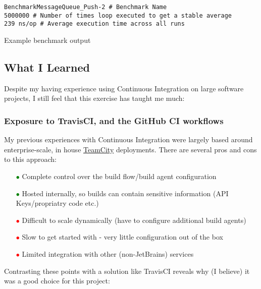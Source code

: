\begin{listing}
  \centering
  \begin{verbatim}
BenchmarkMessageQueue_Push-2 # Benchmark Name
5000000 # Number of times loop executed to get a stable average
239 ns/op # Average execution time across all runs
  \end{verbatim}
  \caption{Example benchmark output}
  \label{lst:goBenchmarkOutput}
\end{listing}

\subsection{What I Learned}
\label{sub:What I Learned}

Despite my having experience using Continuous Integration on large software
projects, I still feel that this exercise has taught me much:

\subsubsection{Exposure to TravisCI, and the GitHub CI workflows}
\label{subs:Exposure to TravisCI, and the GitHub CI workflows}

My previous experiences with Continuous Integration were largely based around
enterprise-scale, in house \href{https://www.jetbrains.com/teamcity/}{TeamCity}
deployments. There are several pros and cons to this approach:

\begin{itemize}
  \item[\textcolor{green}{$\bullet$}] Complete control over the build flow/build agent configuration
  \item[\textcolor{green}{$\bullet$}] Hosted internally, so builds can contain
  sensitive information (API Keys/propriatry code etc.)
  \item[\textcolor{red}{$\bullet$}] Difficult to scale dynamically
  (have to configure additional build agents)
  \item[\textcolor{red}{$\bullet$}] Slow to get started with - very little
  configuration out of the box
  \item[\textcolor{red}{$\bullet$}] Limited integration with other (non-JetBrains)
  services
\end{itemize}

Contrasting these points with a solution like TravisCI reveals why (I believe) it was
a good choice for this project:

